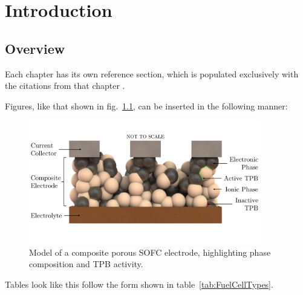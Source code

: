 \chapter{Introduction}

\section{Overview}

Each chapter has its own reference section, which is populated exclusively with the citations from that chapter \cite{Cooper13}.

Figures, like that shown in fig.~\ref{fig:TPBs}, can be inserted in the following manner:

\begin{figure}[H] %
  \centering
  \includegraphics[trim = 0 5mm 0 5mm, clip,width=0.9\textwidth]{C1/Figs/TPBs}
  \caption{Model of a composite porous SOFC electrode, highlighting phase composition and TPB activity.}
  \label{fig:TPBs} 
\end{figure}

Tables look like this follow the form shown in table~\ref{tab:FuelCellTypes}.

